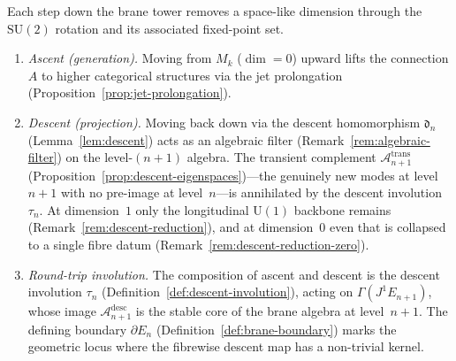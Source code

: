\begin{remark}
\label{rem:descent-fixed-point}
Each step down the brane tower removes a space-like dimension through the
$\mathrm{SU}(2)$ rotation and its associated fixed-point set.
\begin{enumerate}
  \item \emph{Ascent (generation).}  Moving from $M_k$ ($\dim = 0$) upward
        lifts the connection $A$ to higher categorical structures via the jet
        prolongation (Proposition~\ref{prop:jet-prolongation}).
  \item \emph{Descent (projection).}  Moving back down via the descent
        homomorphism $\mathfrak{d}_n$ (Lemma~\ref{lem:descent}) acts as an
        algebraic filter (Remark~\ref{rem:algebraic-filter}) on the
        level-$(n{+}1)$ algebra.  The transient complement
        $\mathcal{A}_{n+1}^{\mathrm{trans}}$
        (Proposition~\ref{prop:descent-eigenspaces})---the genuinely new
        modes at level~$n{+}1$ with no pre-image at level~$n$---is
        annihilated by the descent involution $\tau_n$.
        At dimension~$1$ only the longitudinal
        $\mathrm{U}(1)$ backbone remains
        (Remark~\ref{rem:descent-reduction}), and at dimension~$0$ even
        that is collapsed to a single fibre datum
        (Remark~\ref{rem:descent-reduction-zero}).
  \item \emph{Round-trip involution.}  The composition of ascent and descent
        is the descent involution $\tau_n$
        (Definition~\ref{def:descent-involution}), acting on
        $\Gamma(J^1 E_{n+1})$, whose image
        $\mathcal{A}_{n+1}^{\mathrm{desc}}$ is the stable core of the brane
        algebra at level~$n{+}1$.  The defining boundary $\partial E_n$
        (Definition~\ref{def:brane-boundary}) marks the geometric locus
        where the fibrewise descent map has a non-trivial kernel.
\end{enumerate}
\end{remark}

